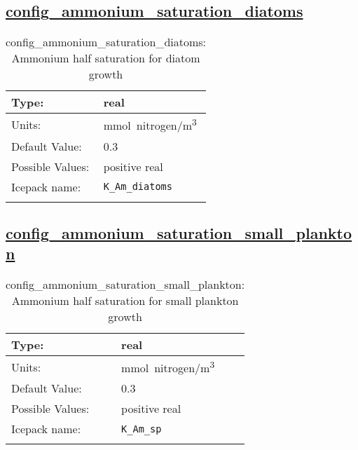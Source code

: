 \subsection[config\_ammonium\_saturation\_diatoms]{\hyperref[sec:nm_tab_biogeochemistry]{config\_ammonium\_saturation\_diatoms}}
\label{subsec:nm_sec_config_ammonium_saturation_diatoms}
\begin{center}
\begin{longtable}{| p{2.0in} || p{4.0in} |}
    \hline
    Type: & real \\
    \hline
    Units: & \si{mmol.nitrogen/m^3} \\
    \hline
    Default Value: & 0.3 \\
    \hline
    Possible Values: & positive real \\
    \hline
    \hline
    Icepack name: & \verb+K_Am_diatoms+ \\
    \caption{config\_ammonium\_saturation\_diatoms: Ammonium half saturation for diatom growth}
\end{longtable}
\end{center}
\subsection[config\_ammonium\_saturation\_small\_plankton]{\hyperref[sec:nm_tab_biogeochemistry]{config\_ammonium\_saturation\_small\_plankton}}
\label{subsec:nm_sec_config_ammonium_saturation_small_plankton}
\begin{center}
\begin{longtable}{| p{2.0in} || p{4.0in} |}
    \hline
    Type: & real \\
    \hline
    Units: & \si{mmol.nitrogen/m^3} \\
    \hline
    Default Value: & 0.3 \\
    \hline
    Possible Values: & positive real \\
    \hline
    \hline
    Icepack name: & \verb+K_Am_sp+ \\
    \caption{config\_ammonium\_saturation\_small\_plankton: Ammonium half saturation for small plankton growth}
\end{longtable}
\end{center}
